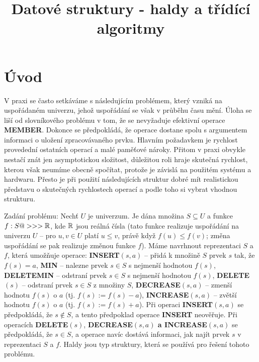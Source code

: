 \documentclass[a4paper,12pt]{article}
\def \emph#1{\underbar{#1}}
\DeclareMathOperator*{\Prob}{Prob}
\begin{document}
     

\newtheorem*{dusledek}{Důsledek}
\newtheorem*{lemma}{Lemma}
\newtheorem*{veta}{Věta}
\newtheorem*{tvrzeni}{Tvrzení}

\def \emph#1{\underbar{#1}}
\def \Prob{\operatorname{Prob}}
\def \var{\operatorname{var}}

\title{Datové struktury - haldy a třídící algoritmy}
\date{}
\maketitle

\section{Úvod}

V praxi se často setkáváme s následujícím 
problémem, který vzniká na uspořádaném univerzu, jehož 
uspořádání se však v průběhu času mění. Úloha se 
liší od slovníkového problému v tom, že se nevyžaduje  
efektivní operace {\bf MEMBER}. Dokonce se předpokládá, že ope\-race 
dostane spolu s argumentem informaci o uložení 
zpracovávaného prvku. 
Hlav\-ním požadavkem je rychlost provedední ostatních operací a malé 
paměťové nároky. Přitom v praxi obvykle nestačí znát jen 
asymptotickou složitost, důležitou roli hraje skutečná 
rychlost, kterou však neumíme obecně spočítat, protože je závislá na 
použitém systému a hardwaru. Přesto je při použití 
následujících struktur dobré mít realistickou představu o 
skutečných rychlostech operací a podle toho si vybrat 
vhodnou strukturu. 

Zadání problému: Nechť $U$ je univerzum. Je dána množina 
$S\subseteq U$ a funkce $f:S@>>>\Bbb R$, kde $\Bbb R$ jsou reálná čísla (tato 
funkce realizuje uspořádání na univerzu $U$ -- pro $u,
v\in U$ platí 
$u\le v$, právě když $f(u)\le f(v)$; změna uspořádání se pak realizuje 
změnou funkce $f$).
Máme navrhnout reprezentaci $S$ a $f$, která umožňuje 
operace:\newline 
{\bf INSERT$(s,a)$} -- přidá k množině $S$ prvek $s$ tak, že 
$f(s)=a$,\newline 
{\bf MIN} -- nalezne prvek $s\in S$ s nejmenší hodnotou 
$f(s)$,\newline 
{\bf DELETEMIN} -- odstraní prvek $s\in S$ s nejmenší hodnotou 
$f(s)$,\newline 
{\bf DELETE$(s)$} -- odstraní prvek $s\in S$ z množiny $S$,\newline 
{\bf DECREASE$(s,a)$} -- zmenší hodnotu $f(s)$ o $a$ (tj. 
$f(s):=f(s)-a$),\newline 
{\bf INCREASE$(s,a)$} -- zvětší hodnotu $f(s)$ o $a$ (tj. 
$f(s):=f(s)+a$).\newline 
Při operaci {\bf INSERT$(s,a)$} se předpokládá, že $
s\notin S$, a tento 
předpoklad operace {\bf INSERT} neověřuje. Při operacích {\bf DE\-LE\-TE$
(s)$},
{\bf DECREASE$(s,a)$ a INCREASE$(s,a)$} se před\-pokládá, že $
s\in S$, 
a operace navíc dostává informaci, jak najít  
prvek $s$ v reprezentaci $S$ a $f$. Haldy jsou typ 
struktury, která se používá pro řešení tohoto problému. 
\end{document}
